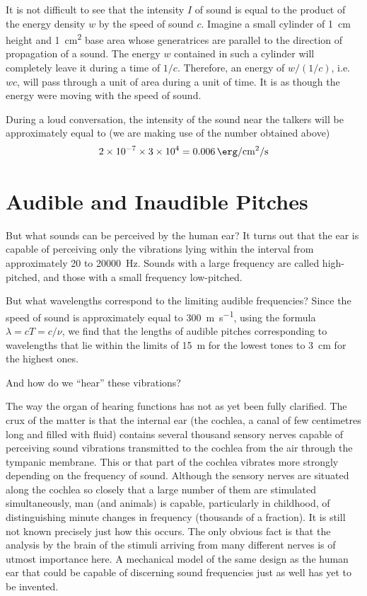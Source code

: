 It is not difficult to see that the intensity $I$ of sound is equal to the product of the energy density $w$ by the speed of sound $c$. Imagine a small cylinder of \SI{1}{\centi\meter} height and \SI{1}{\centi\meter\squared} base area whose generatrices are parallel to the direction of propagation of a sound. The energy $w$ con­tained in such a cylinder will completely leave it during a time of $1/c$. Therefore, an energy of $w/(1/c)$, i.e. $wc$, will
pass through a unit of area during a unit of time. It is as though the energy were moving with the speed of sound.

During a loud conversation, the intensity of the sound near the talkers will be approximately equal to (we are making use of the number obtained above)
\begin{equation*}%
\num{2d-7} \times \num{3d4} = \SI{0.006}{\erg\per\centi\meter\squared\per\second} 
\end{equation*}

\section{Audible and Inaudible Pitches}

But what sounds can be perceived by the human ear? It turns out that the ear is capable of perceiving only the vibrations lying within the interval from approximately 20 to \SI{20000}{\hertz}. Sounds with a large frequency are called high-pitched, and those with a small frequency low-pitched.

But what wavelengths correspond to the limiting au­dible frequencies? Since the speed of sound is approximate­ly equal to \SI{300}{\meter\per\second}, using the formula $\lambda = cT = c/\nu$, we find that the lengths of audible pitches corresponding to wavelengths that lie within the limits of \SI{15}{\meter} for the lowest tones to \SI{3}{\centi\meter} for the highest ones.

And how do we ``hear'' these vibrations?

The way the organ of hearing functions has not as yet been fully clarified. The crux of the matter is that the internal ear (the cochlea, a canal of few centimetres long and filled with fluid) contains several thousand sensory nerves capable of perceiving sound vibrations transmitted to the cochlea from the air through the tympanic mem­brane. This or that part of the cochlea vibrates more strongly depending on the frequency of sound. Although the sen­sory nerves are situated along the cochlea so closely that a large number of them are stimulated simultaneously, man (and animals) is capable, particularly in childhood, of distinguishing minute changes in frequency (thousands of a fraction). It is still not known precisely just how this
occurs. The only obvious fact is that the analysis by the brain of the stimuli arriving from many different nerves is of utmost importance here. A mechanical model of the same design as the human ear that could be capable of discerning sound frequencies just as well has yet to be invented.

